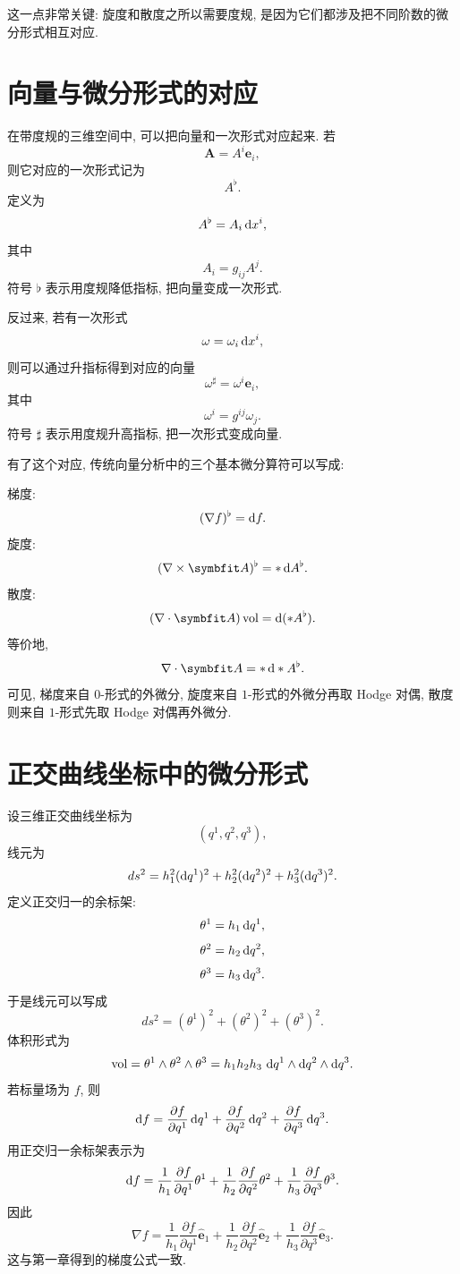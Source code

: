 这一点非常关键: 旋度和散度之所以需要度规, 是因为它们都涉及把不同阶数的微分形式相互对应. 

\section{向量与微分形式的对应}

在带度规的三维空间中, 可以把向量和一次形式对应起来. 若
\[
\bm{A}=A^i\bm{e}_i,
\]
则它对应的一次形式记为
\[
A^\flat.
\]
定义为
\[
A^\flat
=
A_i \mathop{}\!\mathrm{d} x^i,
\]
其中
\[
A_i=g_{ij}A^j.
\]
符号 $\flat$ 表示用度规降低指标, 把向量变成一次形式. 

反过来, 若有一次形式
\[
\omega=\omega_i \mathop{}\!\mathrm{d} x^i,
\]
则可以通过升指标得到对应的向量
\[
\omega^\sharp
=
\omega^i\bm{e}_i,
\]
其中
\[
\omega^i=g^{ij}\omega_j.
\]
符号 $\sharp$ 表示用度规升高指标, 把一次形式变成向量. 

有了这个对应, 传统向量分析中的三个基本微分算符可以写成: 

梯度: 
\[
(\nabla f)^\flat=\mathop{}\!\mathrm{d} f.
\]
旋度: 
\[
(\nabla\times\bm{A})^\flat=*\dif A^\flat.
\]
散度: 
\[
(\nabla\cdot\bm{A})\,\mathrm{vol}=\dif(*A^\flat).
\]
等价地, 
\[
\nabla\cdot\bm{A}=*\dif *A^\flat.
\]
可见, 梯度来自 $0$-形式的外微分, 旋度来自 $1$-形式的外微分再取 Hodge 对偶, 散度则来自 $1$-形式先取 Hodge 对偶再外微分. 

\section{正交曲线坐标中的微分形式}

设三维正交曲线坐标为
\[
(q^1,q^2,q^3),
\]
线元为
\[
ds^2
=
h_1^2(\mathop{}\!\mathrm{d} q^1)^2
+
h_2^2(\mathop{}\!\mathrm{d} q^2)^2
+
h_3^2(\mathop{}\!\mathrm{d} q^3)^2.
\]
定义正交归一的余标架: 
\[
\theta^1=h_1\mathop{}\!\mathrm{d} q^1,
\]
\[
\theta^2=h_2\mathop{}\!\mathrm{d} q^2,
\]
\[
\theta^3=h_3\mathop{}\!\mathrm{d} q^3.
\]
于是线元可以写成
\[
ds^2=(\theta^1)^2+(\theta^2)^2+(\theta^3)^2.
\]
体积形式为
\[
\mathrm{vol}
=
\theta^1\wedge\theta^2\wedge\theta^3
=
h_1h_2h_3\,\mathop{}\!\mathrm{d} q^1\wedge \mathop{}\!\mathrm{d} q^2\wedge \mathop{}\!\mathrm{d} q^3.
\]
若标量场为 $f$, 则
\[
\mathop{}\!\mathrm{d} f
=
\frac{\partial f}{\partial q^1}\mathop{}\!\mathrm{d} q^1
+
\frac{\partial f}{\partial q^2}\mathop{}\!\mathrm{d} q^2
+
\frac{\partial f}{\partial q^3}\mathop{}\!\mathrm{d} q^3.
\]
用正交归一余标架表示为
\[
\mathop{}\!\mathrm{d} f
=
\frac{1}{h_1}\frac{\partial f}{\partial q^1}\theta^1
+
\frac{1}{h_2}\frac{\partial f}{\partial q^2}\theta^2
+
\frac{1}{h_3}\frac{\partial f}{\partial q^3}\theta^3.
\]
因此
\[
\nabla f
=
\frac{1}{h_1}\frac{\partial f}{\partial q^1}\hat{\bm{e}}_1
+
\frac{1}{h_2}\frac{\partial f}{\partial q^2}\hat{\bm{e}}_2
+
\frac{1}{h_3}\frac{\partial f}{\partial q^3}\hat{\bm{e}}_3.
\]
这与第一章得到的梯度公式一致. 

